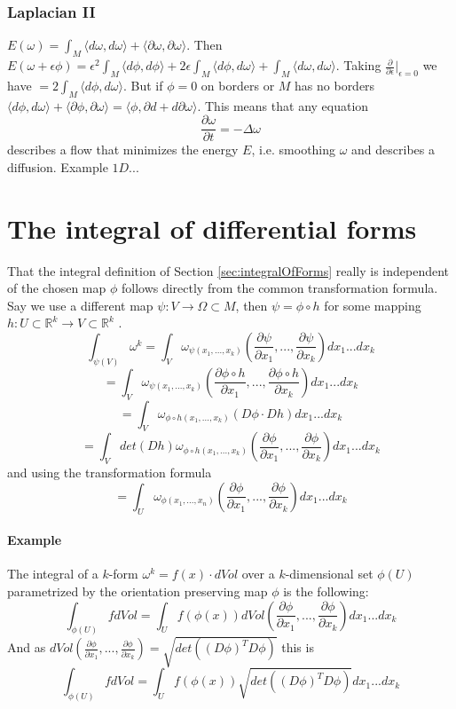 \begin{appendix}

\subsection{Laplacian II}
$E(\omega) = \int_M \langle d\omega, d\omega \rangle + \langle \partial\omega, \partial\omega \rangle$. Then $E(\omega + \epsilon\phi) = \epsilon^2\int_M \langle d\phi, d\phi \rangle + 2\epsilon\int_M \langle d\phi, d\omega \rangle + \int_M \langle d\omega, d\omega \rangle$. Taking $\frac{\partial}{\partial \epsilon} |_{\epsilon = 0}$ we have $=2\int_M \langle d\phi, d\omega \rangle$. But if $\phi = 0$ on borders or $M$ has no borders $\langle d\phi, d\omega \rangle + \langle \partial\phi, \partial\omega \rangle= \langle \phi, \partial d + d \partial\omega \rangle$. This means that any equation 
\[\frac{\partial \omega}{ \partial t} = - \Delta \omega \]
describes a flow that minimizes the energy $E$, i.e. smoothing $\omega$ and describes a diffusion. Example $1D$...
	

\chapter{The integral of differential forms}
\label{app:integrals}

That the integral definition of Section \ref{sec:integralOfForms} really is independent of the chosen map $\phi$ follows directly from the common transformation formula. Say we use a different map $\psi: V \rightarrow \Omega \subset M$, then $\psi = \phi \circ h$ for some mapping $h:U \subset \mathbb R^k \rightarrow V \subset \mathbb R^k$ . 
\[\int_{\psi(V)} \omega^k = \int_V \omega_{\psi(x_1,...,x_k)}(\frac{\partial \psi}{\partial x_1},...,\frac{\partial \psi}{\partial x_k}) d x_1...d x_k\]
\[= \int_V \omega_{\psi(x_1,...,x_k)}(\frac{\partial \phi \circ h}{\partial x_1},...,\frac{\partial \phi \circ h}{\partial x_k}) d x_1...d x_k\]
\[= \int_V \omega_{\phi\circ h(x_1,...,x_k)}(D\phi \cdot Dh) d x_1...d x_k\]
\[= \int_{V} det(Dh) \omega_{\phi\circ h(x_1,...,x_k)}(\frac{\partial \phi}{\partial x_1},...,\frac{\partial \phi}{\partial x_k}) d x_1...d x_k\]
and using the transformation formula
\[= \int_U \omega_{\phi(x_1,...,x_n)} (\frac{\partial \phi}{\partial x_1},...,\frac{\partial \phi}{\partial x_k}) d x_1...d x_k \]

\subsubsection{Example}
The integral of a $k$-form $\omega^k = f(x) \cdot dVol $ over a $k$-dimensional set $\phi(U)$ parametrized by the orientation preserving map $\phi$ is the following:
\[\int_{\phi(U)} f dVol = \int_{U} f(\phi(x)) dVol(\frac{\partial \phi}{\partial x_1},...,\frac{\partial \phi}{\partial x_k})dx_1...dx_k\]
And as $dVol(\frac{\partial \phi}{\partial x_1},...,\frac{\partial \phi}{\partial x_k}) = \sqrt{det((D\phi)^TD\phi)}$ this is
\[\int_{\phi(U)} f dVol = \int_{U} f(\phi(x)) \sqrt{det((D\phi)^TD\phi)} dx_1...dx_k\]


\end{appendix}
